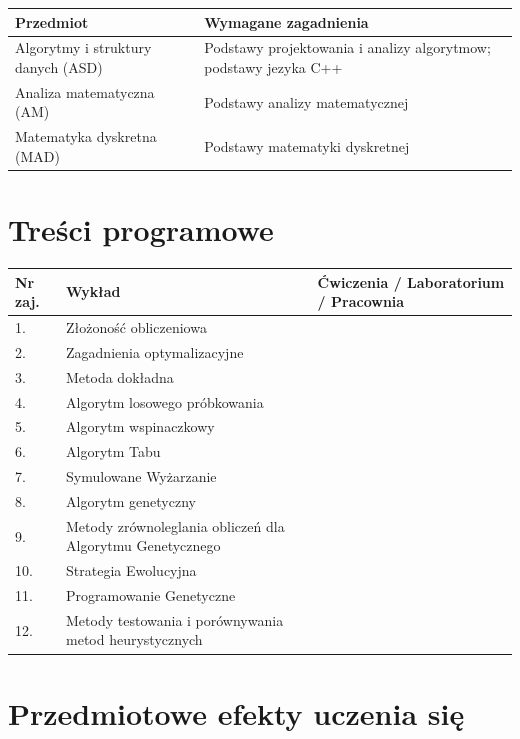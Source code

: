\documentclass[12pt, a4paper]{article}
\begin{document}
\begin{tabularx}{\textwidth}{lX}
  \hline
  \textbf{Przedmiot} & \textbf{Wymagane zagadnienia} \\
  \hline
  Algorytmy i struktury danych (ASD) & Podstawy projektowania i analizy algorytmow; podstawy jezyka C++ \\
  Analiza matematyczna (AM) & Podstawy analizy matematycznej \\
  Matematyka dyskretna (MAD) & Podstawy matematyki dyskretnej \\
  \hline
\end{tabularx}

\section{Treści programowe}

\begin{longtable}{|p{1.5cm}|p{6.5cm}|p{6.5cm}|}
\hline
\textbf{Nr zaj.} & \textbf{Wykład} & \textbf{Ćwiczenia / Laboratorium / Pracownia} \\\hline
\endhead
  \hline
  1. & Złożoność obliczeniowa &  \\
  \hline
  2. & Zagadnienia optymalizacyjne &  \\
  \hline
  3. & Metoda dokładna &  \\
  \hline
  4. & Algorytm losowego próbkowania &  \\
  \hline
  5. & Algorytm wspinaczkowy &  \\
  \hline
  6. & Algorytm Tabu &  \\
  \hline
  7. & Symulowane Wyżarzanie &  \\
  \hline
  8. & Algorytm genetyczny &  \\
  \hline
  9. & Metody zrównoleglania obliczeń dla Algorytmu Genetycznego &  \\
  \hline
  10. & Strategia Ewolucyjna &  \\
  \hline
  11. & Programowanie Genetyczne &  \\
  \hline
  12. & Metody testowania i porównywania metod heurystycznych &  \\
  \hline
\end{longtable}

\section{Przedmiotowe efekty uczenia się}
\end{document}
